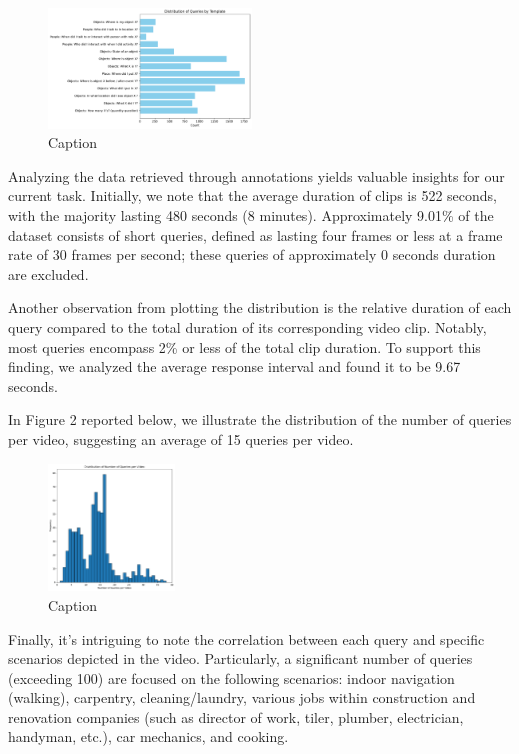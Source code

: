 \documentclass[conference]{IEEEtran}
\begin{document}
\begin{figure}[h]
\centering
\includegraphics[width=0.48\textwidth]{Figure1.pdf} %
\caption{Caption}
\label{fig:figure2}
\end{figure}

Analyzing the data retrieved through annotations yields valuable insights for our current task. Initially, we note that the average duration of clips is 522 seconds, with the majority lasting 480 seconds (8 minutes). Approximately 9.01\% of the dataset consists of short queries, defined as lasting four frames or less at a frame rate of 30 frames per second; these queries of approximately 0 seconds duration are excluded.

Another observation from plotting the distribution is the relative duration of each query compared to the total duration of its corresponding video clip. Notably, most queries encompass 2\% or less of the total clip duration. To support this finding, we analyzed the average response interval and found it to be 9.67 seconds.

In Figure 2 reported below, we illustrate the distribution of the number of queries per video, suggesting an average of 15 queries per video.

\begin{figure}[h]
\centering
\includegraphics[width=0.3\textwidth]{Figure2.pdf} %
\caption{Caption}
\label{fig:figure2}
\end{figure}

Finally, it's intriguing to note the correlation between each query and specific scenarios depicted in the video. Particularly, a significant number of queries (exceeding 100) are focused on the following scenarios: indoor navigation (walking), carpentry, cleaning/laundry, various jobs within construction and renovation companies (such as director of work, tiler, plumber, electrician, handyman, etc.), car mechanics, and cooking.
\end{document}
